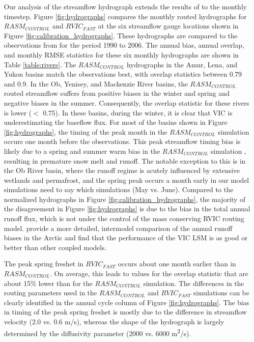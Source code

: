 \documentclass[jgrga, draft]{agutex}
\begin{document}
\begin{article}
Our analysis of the streamflow hydrograph extends the results of \citet{Hamman_2016} to the monthly timestep.
Figure \ref{fig:hydrographs} compares the monthly routed hydrographs for $RASM_{CONTROL}$ and $RVIC_{FAST}$ at the six streamflow gauge locations shown in Figure \ref{fig:calibration_hydrographs}.
These hydrographs are compared to the observations from \citet{Dai_2009} for the period 1990 to 2006.
The annual bias, annual overlap, and monthly RMSE statistics for these six monthly hydrographs are shown in Table \ref{table:rivers}.
The $RASM_{CONTROL}$ hydrographs in the Amur, Lena, and Yukon basins match the observations best, with overlap statistics between 0.79 and 0.9.
In the Ob, Yenisey, and Mackenzie River basins, the $RASM_{CONTROL}$ routed streamflow suffers from positive biases in the winter and spring and negative biases in the summer.
Consequently, the overlap statistic for these rivers is lower ($<$ 0.75).
In these basins, during the winter, it is clear that VIC is underestimating the baseflow flux.
For most of the basins shown in Figure \ref{fig:hydrographs}, the timing of the peak month in the $RASM_{CONTROL}$ simulation occurs one month before the observations.
This peak streamflow timing bias is likely due to a spring and summer warm bias in the $RASM_{CONTROL}$ simulation \citep{Hamman_2016,Cassano_2016}, resulting in premature snow melt and runoff.
The notable exception to this is in the Ob River basin, where the runoff regime is acutely influenced by extensive wetlands and permafrost, and the spring peak occurs a month early in our model simulations {need to say which simulations} (May vs. June).
Compared to the normalized hydrographs in Figure \ref{fig:calibration_hydrographs}, the majority of the disagreement in Figure \ref{fig:hydrographs} is due to the bias in the total annual runoff flux, which is not under the control of the mass conserving RVIC routing model.
\citet{Hamman_2016} provide a more detailed, intermodel comparison of the annual runoff biases in the Arctic and find that the performance of the VIC LSM is as good or better than other coupled models.

The peak spring freshet in $RVIC_{FAST}$ occurs about one month earlier than in $RASM_{CONTROL}$.
On average, this leads to values for the overlap statistic that are about 15\% lower than for the $RASM_{CONTROL}$ simulation.
The differences in the routing parameters used in the $RASM_{CONTROL}$ and $RVIC_{FAST}$ simulations can be clearly identified in the annual cycle column of Figure \ref{fig:hydrographs}.
The bias in timing of the peak spring freshet is mostly due to the difference in streamflow velocity (2.0 vs. 0.6 m/s), whereas the shape of the hydrograph is largely determined by the diffusivity parameter (2000 vs. 6000 m\textsuperscript{2}/s).


\end{article}
\end{document}
